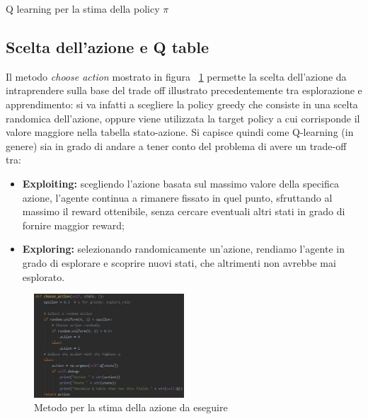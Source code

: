\begin{algorithm}
		\SetAlgoLined
		\caption{Q learning per la stima della policy $\pi$}
		\label{alg:Q_policy}
\end{algorithm}

\subsection{Scelta dell'azione e Q table}
Il metodo \textit{choose action} mostrato in figura ~\ref{fig:ChooseAction_Bucket} permette la scelta dell'azione da intraprendere sulla base del trade off illustrato precedentemente tra esplorazione e apprendimento: si va infatti a scegliere la policy greedy che consiste in una scelta randomica dell'azione, oppure viene utilizzata la target policy a cui corrisponde il valore maggiore nella tabella stato-azione.
Si capisce quindi come Q-learning (in genere) sia in grado di andare a tener conto del problema di avere un trade-off tra:
\begin{itemize}
	\item \textbf{Exploiting: }scegliendo l'azione basata sul massimo valore della specifica azione, l'agente continua a rimanere fissato in quel punto, sfruttando al massimo il reward ottenibile, senza cercare eventuali altri stati in grado di fornire maggior reward;
	\item \textbf{Exploring: }selezionando randomicamente un'azione, rendiamo l'agente in grado di esplorare e scoprire nuovi stati, che altrimenti non avrebbe mai esplorato. 
\end{itemize}
\begin{figure}[!h]
	\centering
	\includegraphics[width=0.5\textwidth]{Immagini/ChooseAction_QTable.JPG}
	\caption{Metodo per la stima della azione da eseguire}
	\label{fig:ChooseAction_Bucket}
\end{figure}

